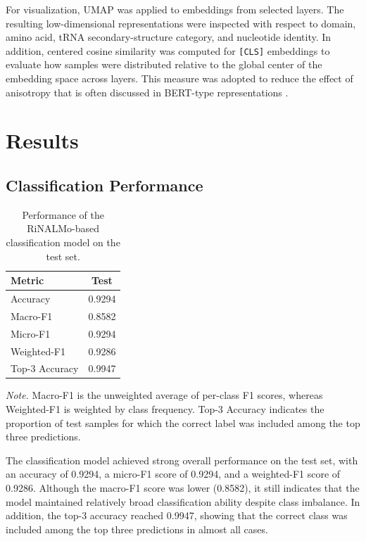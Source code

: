 \documentclass[a4paper,11pt,draft]{jsarticle}
\begin{document}
For visualization, UMAP was applied to embeddings from selected layers. The resulting low-dimensional representations were inspected with respect to domain, amino acid, tRNA secondary-structure category, and nucleotide identity. In addition, centered cosine similarity was computed for \texttt{[CLS]} embeddings to evaluate how samples were distributed relative to the global center of the embedding space across layers. This measure was adopted to reduce the effect of anisotropy that is often discussed in BERT-type representations \cite{su2021whitening}.

\section{Results}

\subsection{Classification Performance}

\begin{table}[H]
  \centering
  \caption{Performance of the RiNALMo-based classification model on the test set.}
  \begin{tabular}{lc}
    \toprule
    Metric         & Test   \\
    \midrule
    Accuracy       & 0.9294 \\
    Macro-F1       & 0.8582 \\
    Micro-F1       & 0.9294 \\
    Weighted-F1    & 0.9286 \\
    Top-3 Accuracy & 0.9947 \\
    \bottomrule
  \end{tabular}
  \label{tab:rinalmo_test_eval}

  \vspace{0.5em}
  \begin{minipage}{0.9\linewidth}
    \footnotesize
    \textit{Note.} Macro-F1 is the unweighted average of per-class F1 scores, whereas Weighted-F1 is weighted by class frequency. Top-3 Accuracy indicates the proportion of test samples for which the correct label was included among the top three predictions.
  \end{minipage}
\end{table}

The classification model achieved strong overall performance on the test set, with an accuracy of 0.9294, a micro-F1 score of 0.9294, and a weighted-F1 score of 0.9286. Although the macro-F1 score was lower (0.8582), it still indicates that the model maintained relatively broad classification ability despite class imbalance. In addition, the top-3 accuracy reached 0.9947, showing that the correct class was included among the top three predictions in almost all cases.
\end{document}
